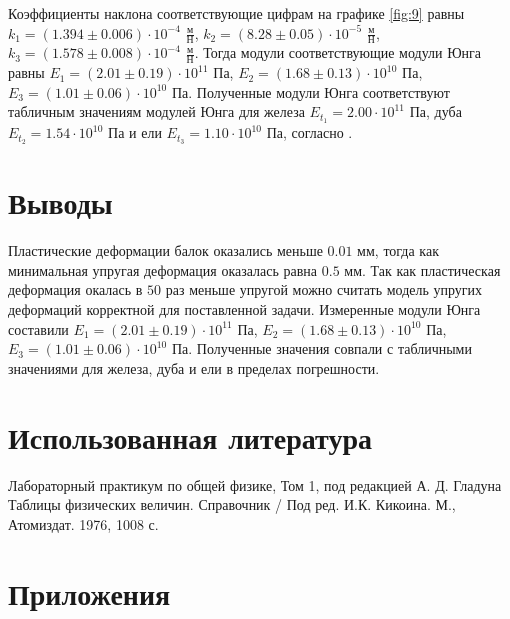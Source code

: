 \documentclass[12pt]{article}
\begin{document}
Коэффициенты наклона соответствующие цифрам на графике \ref{fig:9} равны $k_1 = (1.394 \pm 0.006) \cdot 10^{-4}$ $\frac{\textrm{м}}{\textrm{Н}}$, 
$k_2 = (8.28 \pm 0.05) \cdot 10^{-5}$ $\frac{\textrm{м}}{\textrm{Н}}$, $k_3 = (1.578 \pm 0.008) \cdot 10^{-4}$ $\frac{\textrm{м}}{\textrm{Н}}$.
Тогда модули соответствующие модули Юнга равны $E_1 = (2.01 \pm 0.19) \cdot 10^{11} \textrm{ Па}$, 
$E_2 = (1.68 \pm 0.13) \cdot 10^{10} \textrm{ Па}$, $E_3 = (1.01 \pm 0.06) \cdot 10^{10} \textrm{ Па}$. Полученные модули Юнга соответствуют табличным
значениям модулей Юнга для железа $E_{t_1} = 2.00 \cdot 10^{11} \textrm{ Па}$, дуба $E_{t_2} = 1.54 \cdot 10^{10} \textrm{ Па}$ и 
ели $E_{t_3} = 1.10 \cdot 10^{10} \textrm{ Па}$, согласно \cite{ValuesBook}.

\section{Выводы}
Пластические деформации балок оказались меньше $0.01$ мм, тогда как минимальная упругая деформация оказалась равна $0.5$ мм.
Так как пластическая деформация окалась в $50$ раз меньше упругой можно считать модель упругих деформаций корректной для поставленной задачи.
Измеренные модули Юнга составили $E_1 = (2.01 \pm 0.19) \cdot 10^{11} \textrm{ Па}$, 
$E_2 = (1.68 \pm 0.13) \cdot 10^{10} \textrm{ Па}$, $E_3 = (1.01 \pm 0.06) \cdot 10^{10} \textrm{ Па}$. Полученные значения совпали с табличными
значениями для железа, дуба и ели в пределах погрешности.

\section{Использованная литература}
\begin{thebibliography}{9}
    Лабораторный практикум по общей физике, Том 1, под редакцией А. Д. Гладуна
    Таблицы физических величин. Справочник / Под ред. И.К. Кикоина. М., Атомиздат. 1976, 1008 с.
\end{thebibliography}

\section{Приложения}
\end{document}
